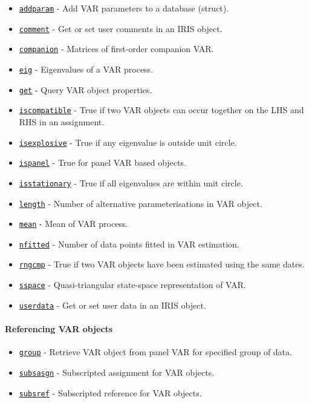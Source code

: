 \begin{itemize}
\itemsep1pt\parskip0pt
\item
  \href{VAR/addparam}{\texttt{addparam}} - Add VAR parameters to a
  database (struct).
\item
  \href{VAR/comment}{\texttt{comment}} - Get or set user comments in an
  IRIS object.
\item
  \href{VAR/companion}{\texttt{companion}} - Matrices of first-order
  companion VAR.
\item
  \href{VAR/eig}{\texttt{eig}} - Eigenvalues of a VAR process.
\item
  \href{VAR/get}{\texttt{get}} - Query VAR object properties.
\item
  \href{VAR/iscompatible}{\texttt{iscompatible}} - True if two VAR
  objects can occur together on the LHS and RHS in an assignment.
\item
  \href{VAR/isexplosive}{\texttt{isexplosive}} - True if any eigenvalue
  is outside unit circle.
\item
  \href{VAR/ispanel}{\texttt{ispanel}} - True for panel VAR based
  objects.
\item
  \href{VAR/isstationary}{\texttt{isstationary}} - True if all
  eigenvalues are within unit circle.
\item
  \href{VAR/length}{\texttt{length}} - Number of alternative
  parameterisations in VAR object.
\item
  \href{VAR/mean}{\texttt{mean}} - Mean of VAR process.
\item
  \href{VAR/nfitted}{\texttt{nfitted}} - Number of data points fitted in
  VAR estimation.
\item
  \href{VAR/rngcmp}{\texttt{rngcmp}} - True if two VAR objects have been
  estimated using the same dates.
\item
  \href{VAR/sspace}{\texttt{sspace}} - Quasi-triangular state-space
  representation of VAR.
\item
  \href{VAR/userdata}{\texttt{userdata}} - Get or set user data in an
  IRIS object.
\end{itemize}

\paragraph{Referencing VAR objects}\label{referencing-var-objects}

\begin{itemize}
\itemsep1pt\parskip0pt
\item
  \href{VAR/group}{\texttt{group}} - Retrieve VAR object from panel VAR
  for specified group of data.
\item
  \href{VAR/subsasgn}{\texttt{subsasgn}} - Subscripted assignment for
  VAR objects.
\item
  \href{VAR/subsref}{\texttt{subsref}} - Subscripted reference for VAR
  objects.
\end{itemize}

